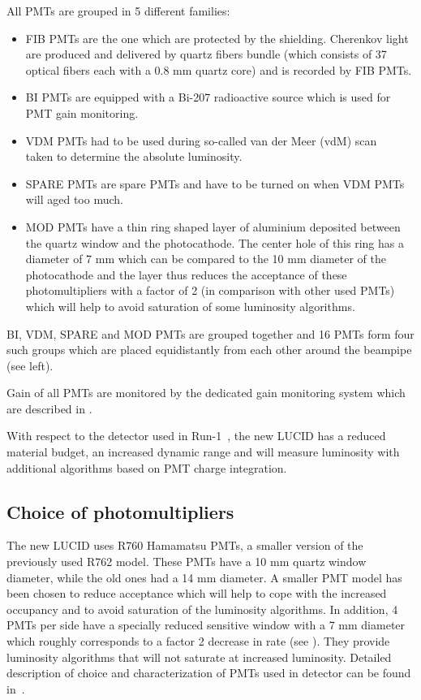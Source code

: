 All PMTs are grouped in 5 different families:
\begin{itemize}
 \item FIB PMTs are the one which are protected by the shielding. Cherenkov light are produced and delivered by quartz fibers bundle 
 (which consists of 37 optical fibers each with a 0.8 mm quartz core) and is recorded by FIB PMTs.
 \item BI PMTs are equipped with a Bi-207 radioactive source which is used for PMT gain monitoring. 
 \item VDM PMTs had to be used during so-called van der Meer (vdM) scan ~\cite{vanderMeer:296752,Rubbia:1025746} taken to determine the absolute luminosity.
 \item SPARE PMTs are spare PMTs and have to be turned on when VDM PMTs will aged too much.
 \item MOD PMTs have a thin ring shaped layer of aluminium deposited between the quartz window and the photocathode. 
 The center hole of this ring has a diameter of 7 mm which can be compared to the 10 mm diameter of the photocathode 
 and the layer thus reduces the acceptance of these photomultipliers with a factor of 2 (in comparison with other used PMTs) 
 which will help to avoid saturation of some luminosity algorithms.
\end{itemize}

BI, VDM, SPARE and MOD PMTs are grouped together and 16 PMTs form four such groups which are placed equidistantly from each other around the beampipe (see  left).

Gain of all PMTs are monitored by the dedicated gain monitoring system which are described in .

With respect to the detector used in Run-1~\cite{Aad:2013ucp}, the new LUCID has a reduced material budget, 
an increased dynamic range and will measure luminosity with additional algorithms based on PMT charge integration. 

\subsection{Choice of photomultipliers}
\label{subsec:PMTChoice}


The new LUCID uses R760 Hamamatsu PMTs, a smaller version of the previously used R762 model. These PMTs have a 
10 mm quartz window diameter, while the old ones had a 14 mm diameter. A smaller PMT model has been chosen to reduce acceptance 
which will help to cope with the increased occupancy and to avoid saturation of the luminosity algorithms.
In addition, 4 PMTs per side have a specially reduced sensitive window with a 7 mm diameter which roughly 
corresponds to a factor 2 decrease in rate (see ). They provide luminosity algorithms that will not saturate at 
increased luminosity. Detailed description of choice and characterization of PMTs used in detector can be found in~\cite{Alberghi:2016tad}.

